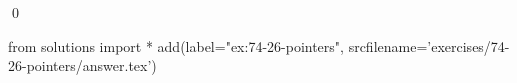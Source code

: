 
\begin{ex}
  \label{ex:74-26-pointers}
  
  \qed
\end{ex}
\begin{python0}
from solutions import *
add(label="ex:74-26-pointers",
    srcfilename='exercises/74-26-pointers/answer.tex')
\end{python0}
